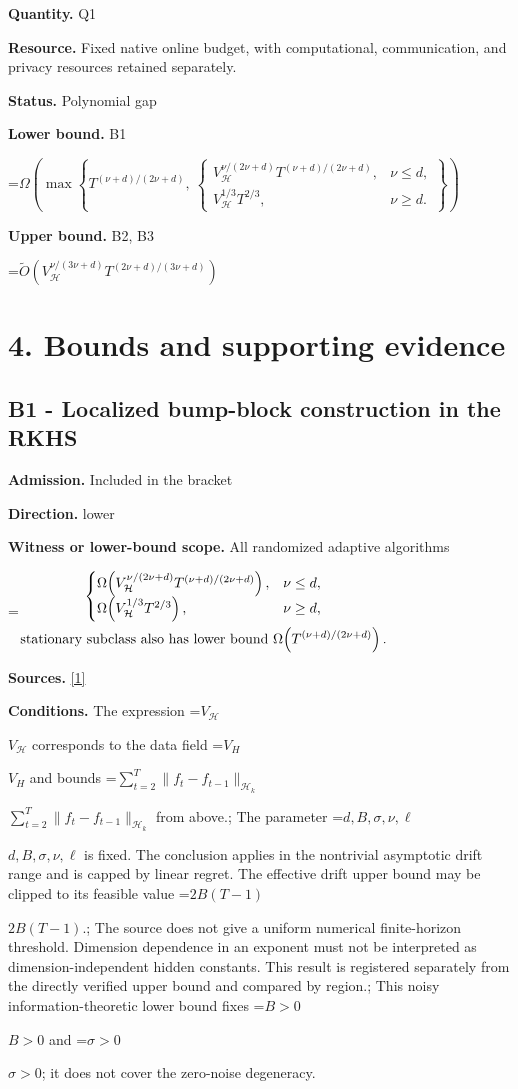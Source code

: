 \documentclass[10pt,a4paper]{article}
\newcommand{\AtlasMath}[1]{\par\begingroup\centering\setbox0=\hbox{$\displaystyle #1$}\ifdim\wd0>1.4\linewidth\typeout{ATLAS WIDE FORMULA: \the\wd0}\fi\ifdim\wd0>\linewidth\resizebox{\linewidth}{!}{\box0}\else\box0\fi\par\endgroup}
\newcommand{\AtlasInlineMath}[1]{\begingroup\setbox0=\hbox{$#1$}\ifdim\wd0>.4\linewidth\endgroup\AtlasMath{#1}\else\endgroup$#1$\fi}
\begin{document}
\textbf{Quantity.} Q1

\textbf{Resource.} Fixed native online budget, with computational, communication, and privacy resources retained separately.

\textbf{Status.} Polynomial gap

\textbf{Lower bound.} B1

\AtlasMath{\Omega(\max\left\{T^{(\nu+d)/(2\nu+d)},\ \begin{cases}V_{\mathcal{H}}^{\nu/(2\nu+d)}T^{(\nu+d)/(2\nu+d)},&\nu\le d,\\ V_{\mathcal{H}}^{1/3}T^{2/3},&\nu\ge d.\end{cases}\right\})}
\textbf{Upper bound.} B2, B3

\AtlasMath{\widetilde{O}\!\left(V_{\mathcal{H}}^{\nu/(3\nu+d)}T^{(2\nu+d)/(3\nu+d)}\right)}
\section{4. Bounds and supporting evidence}
\subsection{B1 - Localized bump-block construction in the RKHS}
\textbf{Admission.} Included in the bracket

\textbf{Direction.} lower

\textbf{Witness or lower-bound scope.} All randomized adaptive algorithms

\AtlasMath{\begin{gathered}\begin{cases}\Omega\!\left(V_{\mathcal{H}}^{\nu/(2\nu+d)}T^{(\nu+d)/(2\nu+d)}\right),&\nu\le d,\\ \Omega\!\left(V_{\mathcal{H}}^{1/3}T^{2/3}\right),&\nu\ge d,\end{cases}\\ \text{\text{stationary subclass also has lower bound} }\Omega\!\left(T^{(\nu+d)/(2\nu+d)}\right).\end{gathered}}
\textbf{Sources.} \href{https://raw.githubusercontent.com/mlresearch/v258/main/assets/cai25a/cai25a.pdf}{[1]}

\textbf{Conditions.} The expression \AtlasInlineMath{V_{\mathcal H}} corresponds to the data field \AtlasInlineMath{V_H} and bounds \AtlasInlineMath{\sum_{t=2}^T\|f_t-f_{t-1}\|_{\mathcal H_k}} from above.; The parameter \AtlasInlineMath{d,B,\sigma,\nu,\ell} is fixed. The conclusion applies in the nontrivial asymptotic drift range and is capped by linear regret. The effective drift upper bound may be clipped to its feasible value \AtlasInlineMath{2B(T-1)}.; The source does not give a uniform numerical finite-horizon threshold. Dimension dependence in an exponent must not be interpreted as dimension-independent hidden constants. This result is registered separately from the directly verified upper bound and compared by region.; This noisy information-theoretic lower bound fixes \AtlasInlineMath{B>0} and \AtlasInlineMath{\sigma>0}; it does not cover the zero-noise degeneracy.
\end{document}

